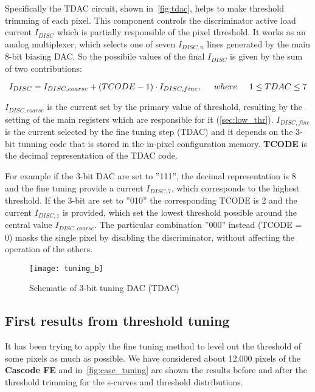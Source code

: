 Specifically the TDAC circuit, shown in~\autoref{fig:tdac}, helps to make threshold trimming of each pixel. This component controls the discriminator active load current $I_{DISC}$ which is partially responsible of the pixel threshold. It works as an analog multiplexer, which selects one of seven $I_{DISC, n}$ lines generated by the main 8-bit biasing DAC. So the possibile values of the final $I_{DISC}$ is given by the sum of two contributions:

\begin{equation}
I_{DISC} = I_{DISC, coarse} + (TCODE - 1) \cdot I_{DISC,fine},  \hspace{.5cm}	where \hspace{.5cm} 1 \leq TDAC \leq 7
\label{eq:tuning_eq}
\end{equation}

\textbf{$I_{DISC, coarse}$} is the current set by the primary value of threshold, resulting by the setting of the main registers which are responsible for it (\autoref{sec:low_thr}). 
\textbf{$I_{DISC, fine}$} is the current selected by the fine tuning step (TDAC) and it depends on the 3-bit tunning code that is stored in the in-pixel configuration memory.
\textbf{TCODE} is the decimal representation of the TDAC code. 

For example if the 3-bit DAC are set to ''111'', the decimal representation is 8 and the fine tuning provide a current $I_{DISC,7}$, which corresponds to the highest threshold. If the 3-bit are set to ''010'' the corresponding TCODE is 2 and the current $I_{DISC,1}$ is provided,  which set the lowest threshold possible around the central value $I_{DISC,coarse}$. The particular combination ''000'' instead (TCODE = 0) masks the single pixel by disabling the discriminator, without affecting the operation of the others.

\begin{figure}
\centering
\texttt{[image: tuning\_b]}
\caption{Schematic of 3-bit tuning DAC (TDAC)}
\label{fig:tdac}
\end{figure}


\subsection{First results from threshold tuning}


It has been trying to apply the fine tuning method to level out the threshold of some pixels as much as possible. We have considered about 12.000 pixels of the \textbf{Cascode FE} and in~\autoref{fig:casc_tuning} are shown the results before and after the threshold trimming for the s-curves and threshold distributions.


